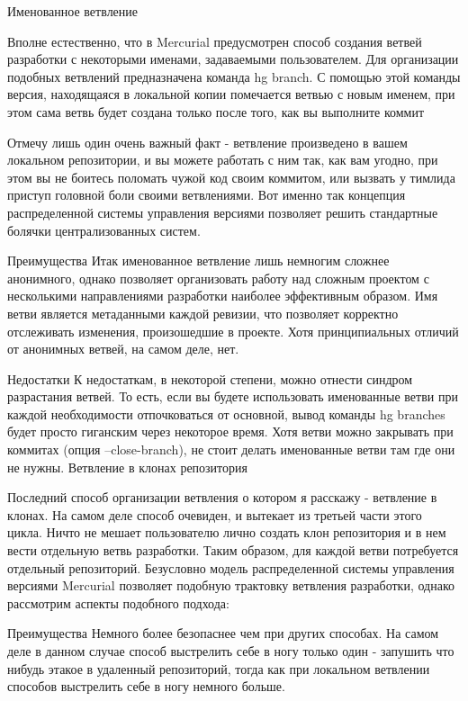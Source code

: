 \documentclass{../industrial-development}
\begin{document}
Именованное ветвление

Вполне естественно, что в Mercurial предусмотрен способ создания ветвей разработки с некоторыми именами, задаваемыми пользователем. Для организации подобных ветвлений предназначена команда hg branch. С помощью этой команды версия, находящаяся в локальной копии помечается ветвью с новым именем, при этом сама ветвь будет создана только после того, как вы выполните коммит

Отмечу лишь один очень важный факт - ветвление произведено в вашем локальном репозитории, и вы можете работать с ним так, как вам угодно, при этом вы не боитесь поломать чужой код своим коммитом, или вызвать у тимлида приступ головной боли своими ветвлениями. Вот именно так концепция распределенной системы управления версиями позволяет решить стандартные болячки централизованных систем.

Преимущества
Итак именованное ветвление лишь немногим сложнее анонимного, однако позволяет организовать работу над сложным проектом с несколькими направлениями разработки наиболее эффективным образом. Имя ветви является метаданными каждой ревизии, что позволяет корректно отслеживать изменения, произошедшие в проекте. Хотя принципиальных отличий от анонимных ветвей, на самом деле, нет.

Недостатки
К недостаткам, в некоторой степени, можно отнести синдром разрастания ветвей. То есть, если вы будете использовать именованные ветви при каждой необходимости отпочковаться от основной, вывод команды hg branches будет просто гиганским через некоторое время. Хотя ветви можно закрывать при коммитах (опция --close-branch), не стоит делать именованные ветви там где они не нужны.
Ветвление в клонах репозитория

Последний способ организации ветвления о котором я расскажу - ветвление в клонах. На самом деле способ очевиден, и вытекает из третьей части этого цикла. Ничто не мешает пользователю лично создать клон репозитория и в нем вести отдельную ветвь разработки. Таким образом, для каждой ветви потребуется отдельный репозиторий. Безусловно модель распределенной системы управления версиями Mercurial позволяет подобную трактовку ветвления разработки, однако рассмотрим аспекты подобного подхода:

Преимущества
Немного более безопаснее чем при других способах. На самом деле в данном случае способ выстрелить себе в ногу только один - запушить что нибудь этакое в удаленный репозиторий, тогда как при локальном ветвлении способов выстрелить себе в ногу немного больше.
\end{document}
